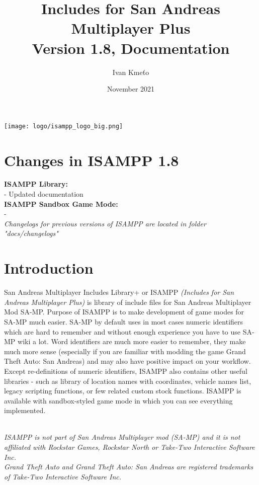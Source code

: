 \documentclass{article}
\title{Includes for San Andreas Multiplayer Plus\\Version 1.8, Documentation}
\author{Ivan Kmeťo}
\date{November 2021}
\begin{document}
\maketitle
\begin{center}
\texttt{[image: logo/isampp\_logo\_big.png]}
\end{center}

\newpage
\tableofcontents

\newpage
\section{Changes in ISAMPP 1.8}
\textbf{ISAMPP Library:}
\\- Updated documentation
\bigskip
\\\textbf{ISAMPP Sandbox Game Mode:}
\\- 
\bigskip
\\\textit{Changelogs for previous versions of ISAMPP are located in folder "docs/changelogs"}

\newpage
\section{Introduction}
San Andreas Multiplayer Includes Library+ or ISAMPP \textit{(Includes for San Andreas Multiplayer Plus)} is library of include files for San Andreas Multiplayer Mod SA-MP. Purpose of ISAMPP is to make development of game modes for SA-MP much easier. SA-MP by default uses in most cases numeric identifiers which are hard to remember and without enough experience you have to use SA-MP wiki a lot. Word identifiers are much more easier to remember, they make much more sense (especially if you are familiar with modding the game Grand Theft Auto: San Andreas) and may also have positive impact on your workflow. Except re-definitions of numeric identifiers, ISAMPP also contains other useful libraries - such as library of location names with coordinates, vehicle names list, legacy scripting functions, or few related custom stock functions. ISAMPP is available with sandbox-styled game mode in which you can see everything implemented.

\textit{\\ISAMPP is not part of San Andreas Multiplayer mod (SA-MP) and it is not affiliated with Rockstar Games, Rockstar North or Take-Two Interactive Software Inc.}
\textit{\\Grand Theft Auto and Grand Theft Auto: San Andreas are registered trademarks of Take-Two Interactive Software Inc.}
\end{document}
